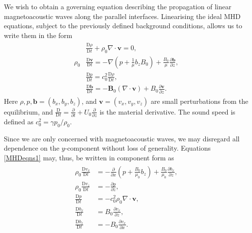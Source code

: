 We wish to obtain a governing equation describing the propagation of linear magnetoacoustic waves along the parallel interfaces.
Linearising the ideal MHD equations, subject to the previously defined background conditions, allows us to write them in the form
\begin{align}
\begin{split}
\label{MHDeqns1}
& \frac{\mathrm{D} \rho}{\mathrm{D} t}
+ \rho_0 \nabla \cdot \mathbf{v}
= 0,
\\
\rho_0 & \frac{\mathrm{D} \mathbf{v}}{\mathrm{D} t}
= - \nabla ( p + \frac{1}{\mu} b_z B_0 )
+ \frac{B_0}{\mu} \frac{\partial \mathbf{b}}{\partial z},
\\
& \frac{\mathrm{D} p}{\mathrm{D} t}
= c_0^2 \frac{\mathrm{D} \rho}{\mathrm{D} t},
\\
& \frac{\mathrm{D} \mathbf{b}}{\mathrm{D} t}
= - \mathbf{B}_0 ( \nabla \cdot \mathbf{v} )
+ B_0 \frac{\partial \mathbf{v}}{\partial z}.
\end{split}
\end{align}
Here $\rho, p, \mathbf{b} = (b_x, b_y, b_z)$, and $\mathbf{v} = (v_x, v_y, v_z)$ are small perturbations from the equilibrium, and $\frac{\mathrm{D}}{\mathrm{D} t} = \frac{\partial}{\partial t} + U_0 \frac{\partial}{\partial z}$ is the material derivative.
The sound speed is defined as $c_0^2 = \gamma p_0/\rho_0$.

Since we are only concerned with magnetoacoustic waves, we may disregard all dependence on the $y$-component without loss of generality. 
Equations \eqref{MHDeqns1} may, thus, be written in component form as
\begin{align}
\begin{split}
\label{MHDeqns2}
\rho_0 \frac{\mathrm{D} v_x}{\mathrm{D} t}
& = - \frac{\partial}{\partial x} \left (p + \frac{B_0}{\mu_0} b_z \right )
+ \frac{B_0}{\mu_0} \frac{\partial b_x}{\partial z},
\\
\rho_0 \frac{\mathrm{D} v_z}{\mathrm{D} t}
& = - \frac{\partial p}{\partial z},
\\
\frac{\mathrm{D} p}{\mathrm{D} t} &
= - c_0^2 \rho_0 \nabla \cdot \mathbf{v},
\\
\frac{\mathrm{D} b_x}{\mathrm{D} t}
& = B_0 \frac{\partial v_x}{\partial z},
\\
\frac{\mathrm{D} b_z}{\mathrm{D} t}
& = - B_0 \frac{\partial v_x}{\partial x}.
\end{split}
\end{align}

